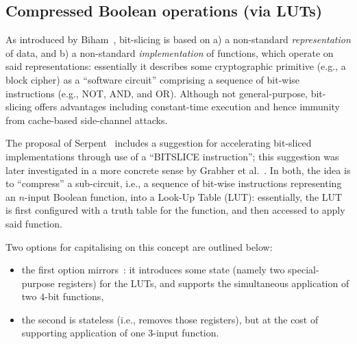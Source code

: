 \subsection{Compressed Boolean operations (via LUTs)}

As introduced by Biham~\cite{SCARV:Biham:97}, bit-slicing is based on
a) a non-standard {\em representation} of data,
   and
b) a non-standard {\em implementation} of functions, which operate on
   said representations:
essentially it describes some cryptographic primitive (e.g., a block
cipher) as a  ``software circuit'' comprising a sequence of bit-wise 
instructions (e.g., NOT, AND, and OR).  Although not general-purpose,
bit-slicing offers advantages including constant-time execution and 
hence immunity from cache-based side-channel attacks.

The proposal of Serpent~\cite[Page 232]{SCARV:BihAndKnu:98} includes 
a suggestion for accelerating bit-sliced implementations through use 
of a ``BITSLICE instruction''; this suggestion was later investigated 
in a more concrete sense by Grabher et al.~\cite{SCARV:GraGroPag:08}.
In both, the idea is to ``compress'' a sub-circuit, i.e., a sequence 
of bit-wise instructions representing an $n$-input Boolean function,
into a Look-Up Table (LUT): essentially, the LUT is first configured 
with a truth table for the function, and then accessed to apply said
function.  

Two options for capitalising on this concept are outlined below:

\begin{itemize}
\item the first option mirrors~\cite{SCARV:GraGroPag:08}:
      it introduces some state (namely two special-purpose registers)
      for the LUTs, and supports the simultaneous application of two 
      $4$-bit functions,
\item the second is stateless (i.e., removes those registers), but at 
      the cost of supporting application of one $3$-input function.
\end{itemize}

